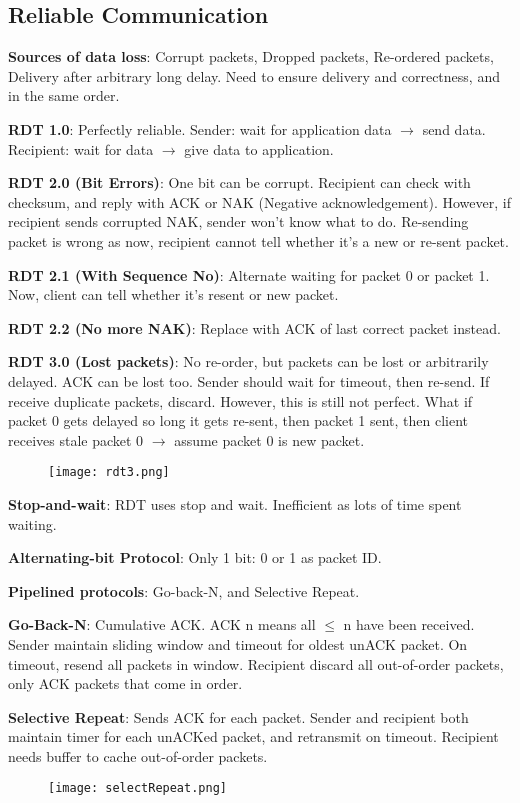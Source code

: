 \documentclass[a4paper,landscape]{article}
\newcommand{\rntopic}[1]{\vspace{-2.0em}\subsection*{#1}\vspace{-1.0em}}
\newcommand{\rnname}[1]{\textbf{#1}}
\begin{document}
\begin{multicols*}{4}
\rntopic{Reliable Communication}
\begin{flatitemize}
\item \rnname{Sources of data loss}: Corrupt packets, Dropped packets, Re-ordered packets, Delivery after arbitrary long delay. Need to ensure delivery and correctness, and in the same order.
\item \rnname{RDT 1.0}: Perfectly reliable. Sender: wait for application data $\rightarrow$ send data. Recipient: wait for data $\rightarrow$ give data to application.
\item \rnname{RDT 2.0 (Bit Errors)}: One bit can be corrupt. Recipient can check with checksum, and reply with ACK or NAK (Negative acknowledgement). However, if recipient sends corrupted NAK, sender won't know what to do. Re-sending packet is wrong as now, recipient cannot tell whether it's a new or re-sent packet.
\item \rnname{RDT 2.1 (With Sequence No)}: Alternate waiting for packet 0 or packet 1. Now, client can tell whether it's resent or new packet. 
\item \rnname{RDT 2.2 (No more NAK)}: Replace with ACK of last correct packet instead.
\item \rnname{RDT 3.0 (Lost packets)}: No re-order, but packets can be lost or arbitrarily delayed. ACK can be lost too. Sender should wait for timeout, then re-send. If receive duplicate packets, discard. However, this is still not perfect. What if packet 0 gets delayed so long it gets re-sent, then packet 1 sent, then client receives stale packet 0 $\rightarrow$ assume packet 0 is new packet.
\vspace{-1cm}
    \begin{figure}[H]
      \texttt{[image: rdt3.png]}
    \end{figure}
\vspace{-0.4cm}
\item \rnname{Stop-and-wait}: RDT uses stop and wait. Inefficient as lots of time spent waiting.
\item \rnname{Alternating-bit Protocol}: Only 1 bit: 0 or 1 as packet ID.
\item \rnname{Pipelined protocols}: Go-back-N, and Selective Repeat.
\item \rnname{Go-Back-N}: Cumulative ACK. ACK n means all $\leq$ n have been received. Sender maintain sliding window and timeout for oldest unACK packet. On timeout, resend all packets in window. Recipient discard all out-of-order packets, only ACK packets that come in order.
\item \rnname{Selective Repeat}: Sends ACK for each packet. Sender and recipient both maintain timer for each unACKed packet, and retransmit on timeout. Recipient needs buffer to cache out-of-order packets.
    \begin{figure}[H]
      \texttt{[image: selectRepeat.png]}
    \end{figure}
    

\end{flatitemize}
\end{multicols*}
\end{document}
